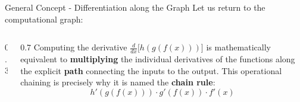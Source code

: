 \begin{frame}{General Concept - Differentiation along the Graph}
	Let us return to the computational graph:
	\begin{columns}
		\begin{column}{0.3\textwidth}
			\begin{center}
			\end{center}			
		\end{column}
		\begin{column}{0.7\textwidth}
			Computing the derivative $\frac{d}{dx} \Big[ h(g(f(x))) \Big]$ is mathematically equivalent to \textbf{multiplying} the individual derivatives of the functions along the explicit \textbf{\textcolor{lime!80!black}{path}} connecting the inputs to the output. This operational chaining is precisely why it is named the \textbf{chain rule}:
			\begin{equation*}
				h'(g(f(x))) \cdot g'(f(x)) \cdot f'(x) 
			\end{equation*}
		\end{column}
	\end{columns}
\end{frame}


